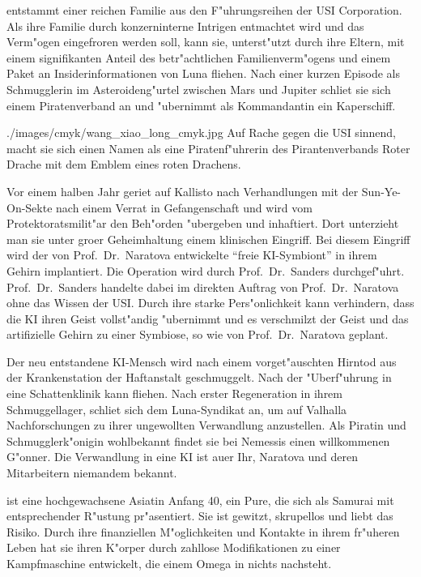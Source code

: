\newpage
{}

\xls{} entstammt einer reichen Familie aus den F"uhrungsreihen der USI Corporation. Als ihre Familie durch konzerninterne Intrigen entmachtet wird und das Verm"ogen eingefroren werden soll, kann sie, unterst"utzt durch ihre Eltern, mit einem signifikanten Anteil des betr"achtlichen Familienverm"ogens und einem Paket an Insiderinformationen von Luna fliehen. Nach einer kurzen Episode als Schmugglerin im Asteroideng"urtel zwischen Mars und Jupiter schlie\3t sie sich einem Piratenverband an und "ubernimmt als Kommandantin ein Kaperschiff. 

\begin{sideimagebox}[r]{0.64}{./images/cmyk/wang_xiao_long_cmyk.jpg}{}
    Auf Rache gegen die USI sinnend, macht sie sich einen Namen als eine Piratenf"uhrerin des Pirantenverbands Roter Drache mit dem Emblem eines roten Drachens.

    Vor einem halben Jahr geriet \xl{} auf Kallisto nach Verhandlungen mit der Sun-Ye-On-Sekte nach einem Verrat in Gefangenschaft und wird vom Protektoratsmilit"ar den Beh"orden "ubergeben und inhaftiert. Dort unterzieht man sie unter gro\3er Geheimhaltung einem klinischen Eingriff. Bei diesem Eingriff wird der von Prof.~Dr.~Naratova entwickelte ``freie KI-Symbiont'' in ihrem Gehirn implantiert. Die Operation wird durch Prof.~Dr.~Sanders durchgef"uhrt. Prof.~Dr.~Sanders handelte dabei im direkten Auftrag von Prof.~Dr.~Naratova ohne das Wissen der USI. Durch ihre starke Pers"onlichkeit kann \xl{} verhindern, dass die KI ihren Geist vollst"andig "ubernimmt und es verschmilzt der Geist und das artifizielle Gehirn zu einer Symbiose, so wie von Prof.~Dr.~Naratova geplant. 
\end{sideimagebox}

Der neu entstandene KI-Mensch wird nach einem vorget"auschten Hirntod aus der Krankenstation der Haftanstalt geschmuggelt. Nach der "Uberf"uhrung in eine Schattenklinik kann \xl{} fliehen. Nach erster Regeneration in ihrem Schmuggellager, schlie\3t sich \xl{} dem Luna-Syndikat an, um auf Valhalla Nachforschungen zu ihrer ungewollten Verwandlung anzustellen. Als Piratin und Schmugglerk"onigin wohlbekannt findet sie bei Nemessis einen willkommenen G"onner. Die Verwandlung in eine KI ist au\3er Ihr, Naratova und deren Mitarbeitern niemandem bekannt.

\xl{} ist eine hochgewachsene Asiatin Anfang 40, ein Pure, die sich als Samurai mit entsprechender R"ustung pr"asentiert. Sie ist gewitzt, skrupellos und liebt das Risiko. Durch ihre finanziellen M"oglichkeiten und Kontakte in ihrem fr"uheren Leben hat sie ihren K"orper durch zahllose Modifikationen zu einer Kampfmaschine entwickelt, die einem Omega in nichts nachsteht.

